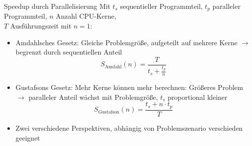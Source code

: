 \documentclass[
  german,            %
  aspectratio=169,    %
]{tumbeamer}
\begin{document}
\begin{frame}[c, fragile]{Speedup durch Parallelisierung}{}
	Mit $t_s$ sequentieller Programmteil, $t_p$ paralleler Programmteil, $n$ Anzahl CPU-Kerne,\\$T$ Ausführungszeit mit $n=1$:
	\begin{itemize}
		\item Amdahlsches Gesetz:
		      Gleiche Problemgröße, aufgeteilt auf mehrere Kerne $\rightarrow$ begrenzt durch sequentiellen Anteil
		      \[S_{\textrm{Amdahl}}(n)=\frac{T}{t_s+\frac{t_p}{n}}\]
		\item Gustafsons Gesetz:
		      Mehr Kerne können mehr berechnen: Größeres Problem$\rightarrow$ paralleler Anteil wächst mit Problemgröße, $t_s$ proportional kleiner
		      \[S_{\textrm{Gustafson}}(n)=\frac{t_s+n\cdot t_p}{T}\]
		\item Zwei verschiedene Perspektiven, abhängig von Problemszenario verschieden geeignet
	\end{itemize}
\end{frame}
\end{document}
